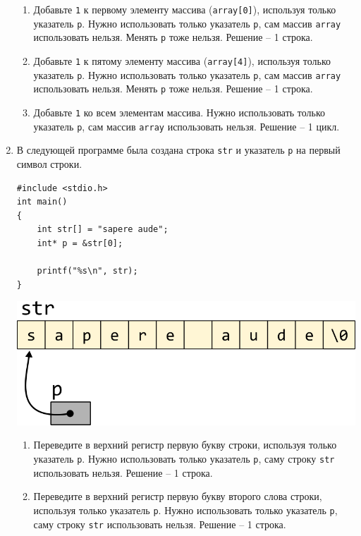 \documentclass{article}
\begin{document}
\begin{enumerate}
\begin{enumerate}
\item Добавьте \texttt{1} к первому элементу массива (\texttt{array[0]}), используя только указатель \texttt{p}. Нужно использовать только указатель \texttt{p}, сам массив \texttt{array} использовать нельзя. Менять \texttt{p} тоже нельзя. Решение -- 1 строка.
\item Добавьте \texttt{1} к пятому элементу массива (\texttt{array[4]}), используя только указатель \texttt{p}. Нужно использовать только указатель \texttt{p}, сам массив \texttt{array} использовать нельзя. Менять \texttt{p} тоже нельзя. Решение -- 1 строка.
\item Добавьте \texttt{1} ко всем элементам массива. Нужно использовать только указатель \texttt{p}, сам массив \texttt{array} использовать нельзя. Решение -- 1 цикл.
\end{enumerate}



\newpage
\item В следующей программе была создана строка \texttt{str} и указатель \texttt{p} на первый символ строки. 
\begin{multicols}{2}
\begin{lstlisting}
#include <stdio.h>
int main() 
{
    int str[] = "sapere aude";
    int* p = &str[0];

    printf("%s\n", str);
}
\end{lstlisting}
\vfill \null    
\columnbreak
\vfill \null 
\begin{center}
\vspace{1cm} 
\includegraphics[scale=0.8]{../images/pointer_schemes/pointer_to_char_array.png}
\end{center}
\end{multicols}

\begin{enumerate}
\item Переведите в верхний регистр первую букву строки, используя только указатель \texttt{p}. Нужно использовать только указатель \texttt{p}, саму строку \texttt{str} использовать нельзя. Решение -- 1 строка.
\item Переведите в верхний регистр первую букву второго слова строки, используя только указатель \texttt{p}. Нужно использовать только указатель \texttt{p}, саму строку \texttt{str} использовать нельзя. Решение -- 1 строка.


\end{enumerate}
\end{enumerate}
\end{document}

